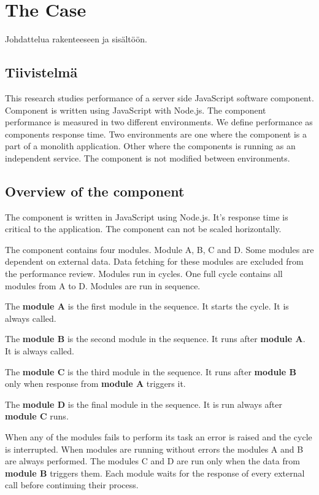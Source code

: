 \chapter{The Case\label{case}}
Johdattelua rakenteeseen ja sisältöön.

\section{Tiivistelmä}
This research studies performance of a server side JavaScript software component.
Component is written using JavaScript with Node.js.
The component performance is measured in two different environments.
We define performance as components response time.
Two environments are one where the component is a part of a monolith application.
Other where the components is running as an independent service.
The component is not modified between environments.

\section{Overview of the component}
The component is written in JavaScript using Node.js.
It's response time is critical to the application.
The component can not be scaled horizontally.

The component contains four modules.
Module A, B, C and D.
Some modules are dependent on external data.
Data fetching for these modules are excluded from the performance review.
Modules run in cycles.
One full cycle contains all modules from A to D.
Modules are run in sequence.

The \textbf{module A} is the first module in the sequence.
It starts the cycle.
It is always called.

The \textbf{module B} is the second module in the sequence.
It runs after \textbf{module A}.
It is always called.

The \textbf{module C} is the third module in the sequence.
It runs after \textbf{module B} only when response from \textbf{module A} triggers it.

The \textbf{module D} is the final module in the sequence.
It is run always after \textbf{module C} runs.

When any of the modules fails to perform its task an error is raised and the cycle is interrupted.
When modules are running without errors the modules A and B are always performed. 
The modules C and D are run only when the data from \textbf{module B} triggers them.
Each module waits for the response of every external call before continuing their process.

